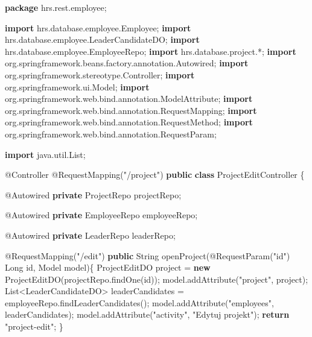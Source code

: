 \documentclass[]{article}
\newenvironment{Shaded}{}{}
\newcommand{\AttributeTok}[1]{\textcolor[rgb]{0.49,0.56,0.16}{#1}}
\newcommand{\BuiltInTok}[1]{#1}
\newcommand{\FunctionTok}[1]{\textcolor[rgb]{0.02,0.16,0.49}{#1}}
\newcommand{\ImportTok}[1]{#1}
\newcommand{\KeywordTok}[1]{\textcolor[rgb]{0.00,0.44,0.13}{\textbf{#1}}}
\newcommand{\NormalTok}[1]{#1}
\newcommand{\StringTok}[1]{\textcolor[rgb]{0.25,0.44,0.63}{#1}}
\begin{document}
\begin{Shaded}
\begin{Highlighting}[]
\KeywordTok{package}\ImportTok{ hrs.rest.employee;}

\KeywordTok{import}\ImportTok{ hrs.database.employee.Employee;}
\KeywordTok{import}\ImportTok{ hrs.database.employee.LeaderCandidateDO;}
\KeywordTok{import}\ImportTok{ hrs.database.employee.EmployeeRepo;}
\KeywordTok{import}\ImportTok{ hrs.database.project.*;}
\KeywordTok{import}\ImportTok{ org.springframework.beans.factory.annotation.Autowired;}
\KeywordTok{import}\ImportTok{ org.springframework.stereotype.Controller;}
\KeywordTok{import}\ImportTok{ org.springframework.ui.Model;}
\KeywordTok{import}\ImportTok{ org.springframework.web.bind.annotation.ModelAttribute;}
\KeywordTok{import}\ImportTok{ org.springframework.web.bind.annotation.RequestMapping;}
\KeywordTok{import}\ImportTok{ org.springframework.web.bind.annotation.RequestMethod;}
\KeywordTok{import}\ImportTok{ org.springframework.web.bind.annotation.RequestParam;}

\KeywordTok{import}\ImportTok{ java.util.List;}

\AttributeTok{@Controller}
\AttributeTok{@RequestMapping}\NormalTok{(}\StringTok{"/project"}\NormalTok{)}
\KeywordTok{public} \KeywordTok{class}\NormalTok{ ProjectEditController \{}

    \AttributeTok{@Autowired}
    \KeywordTok{private}\NormalTok{ ProjectRepo projectRepo;}

    \AttributeTok{@Autowired}
    \KeywordTok{private}\NormalTok{ EmployeeRepo employeeRepo;}

    \AttributeTok{@Autowired}
    \KeywordTok{private}\NormalTok{ LeaderRepo leaderRepo;}

    \AttributeTok{@RequestMapping}\NormalTok{(}\StringTok{"/edit"}\NormalTok{)}
    \KeywordTok{public} \BuiltInTok{String} \FunctionTok{openProject}\NormalTok{(}\AttributeTok{@RequestParam}\NormalTok{(}\StringTok{"id"}\NormalTok{) }\BuiltInTok{Long}\NormalTok{ id, Model model)\{}
\NormalTok{        ProjectEditDO project = }\KeywordTok{new} \FunctionTok{ProjectEditDO}\NormalTok{(projectRepo.}\FunctionTok{findOne}\NormalTok{(id));}
\NormalTok{        model.}\FunctionTok{addAttribute}\NormalTok{(}\StringTok{"project"}\NormalTok{, project);}
        \BuiltInTok{List}\NormalTok{<LeaderCandidateDO> leaderCandidates = employeeRepo.}\FunctionTok{findLeaderCandidates}\NormalTok{();}
\NormalTok{        model.}\FunctionTok{addAttribute}\NormalTok{(}\StringTok{"employees"}\NormalTok{, leaderCandidates);}
\NormalTok{        model.}\FunctionTok{addAttribute}\NormalTok{(}\StringTok{"activity"}\NormalTok{, }\StringTok{"Edytuj projekt"}\NormalTok{);}
        \KeywordTok{return} \StringTok{"project-edit"}\NormalTok{;}
\NormalTok{    \}}


\end{Highlighting}
\end{Shaded}
\end{document}
